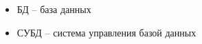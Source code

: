 \begin{itemize}[label=]
	\item БД -- база данных
	\item СУБД -- система управления базой данных
\end{itemize}

\clearpage
